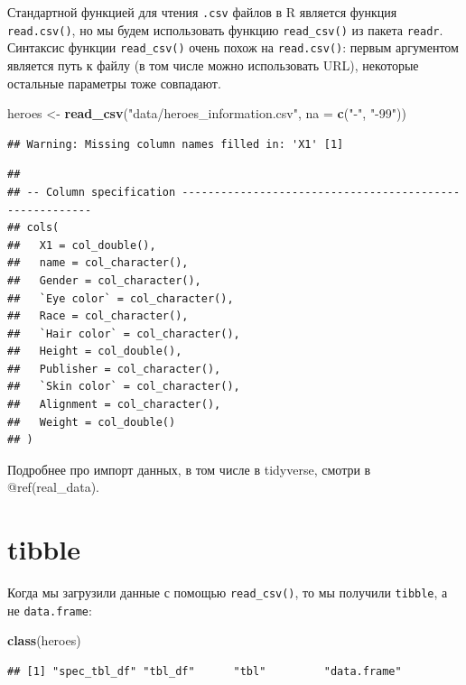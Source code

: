 \documentclass[]{book}
\newenvironment{Shaded}{\begin{snugshade}}{\end{snugshade}}
\newcommand{\KeywordTok}[1]{\textcolor[rgb]{0.13,0.29,0.53}{\textbf{#1}}}
\newcommand{\DataTypeTok}[1]{\textcolor[rgb]{0.13,0.29,0.53}{#1}}
\newcommand{\StringTok}[1]{\textcolor[rgb]{0.31,0.60,0.02}{#1}}
\newcommand{\NormalTok}[1]{#1}
\begin{document}
Стандартной функцией для чтения \texttt{.csv} файлов в R является
функция \texttt{read.csv()}, но мы будем использовать функцию
\texttt{read\_csv()} из пакета \texttt{readr}. Синтаксис функции
\texttt{read\_csv()} очень похож на \texttt{read.csv()}: первым
аргументом является путь к файлу (в том числе можно использовать URL),
некоторые остальные параметры тоже совпадают.

\begin{Shaded}
\begin{Highlighting}[]
\NormalTok{heroes <-}\StringTok{ }\KeywordTok{read_csv}\NormalTok{(}\StringTok{"data/heroes_information.csv"}\NormalTok{,}
                   \DataTypeTok{na =} \KeywordTok{c}\NormalTok{(}\StringTok{"-"}\NormalTok{, }\StringTok{"-99"}\NormalTok{))}
\end{Highlighting}
\end{Shaded}

\begin{verbatim}
## Warning: Missing column names filled in: 'X1' [1]
\end{verbatim}

\begin{verbatim}
## 
## -- Column specification --------------------------------------------------------
## cols(
##   X1 = col_double(),
##   name = col_character(),
##   Gender = col_character(),
##   `Eye color` = col_character(),
##   Race = col_character(),
##   `Hair color` = col_character(),
##   Height = col_double(),
##   Publisher = col_character(),
##   `Skin color` = col_character(),
##   Alignment = col_character(),
##   Weight = col_double()
## )
\end{verbatim}

Подробнее про импорт данных, в том числе в tidyverse, смотри в
@ref(real\_data).

\section{tibble}\label{tibble}

Когда мы загрузили данные с помощью \texttt{read\_csv()}, то мы получили
\texttt{tibble}, а не \texttt{data.frame}:

\begin{Shaded}
\begin{Highlighting}[]
\KeywordTok{class}\NormalTok{(heroes)}
\end{Highlighting}
\end{Shaded}

\begin{verbatim}
## [1] "spec_tbl_df" "tbl_df"      "tbl"         "data.frame"
\end{verbatim}
\end{document}
